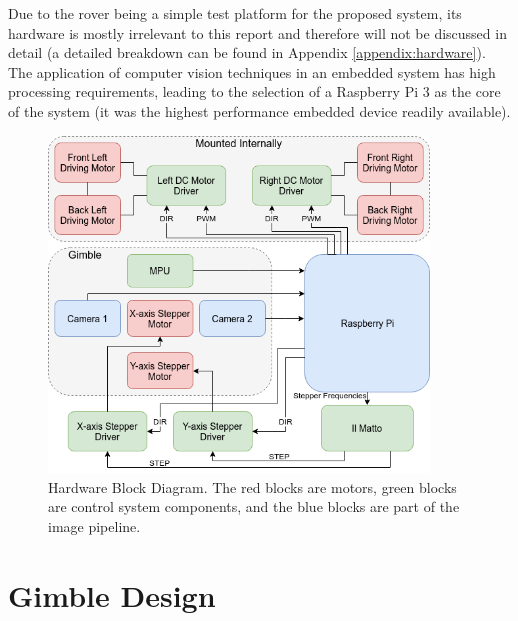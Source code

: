  Due to the rover being a simple test platform for the proposed system, its hardware is mostly irrelevant to this report and therefore will not be discussed in detail (a detailed breakdown can be found in Appendix \ref{appendix:hardware}). The application of computer vision techniques in an embedded system has high processing requirements, leading to the selection of a Raspberry Pi 3 as the core of the system (it was the highest performance embedded device readily available). 

\begin{figure}[H]
    \begin{center}
      \includegraphics[width=0.9\textwidth]{Figures/hardware.png}
      \caption[Hardware Block Diagram]{Hardware Block Diagram. The red blocks are motors, green blocks are control system components, and the blue blocks are part of the image pipeline.}
      \label{fig:hardware}
    \end{center}
\end{figure}

\section{Gimble Design}

